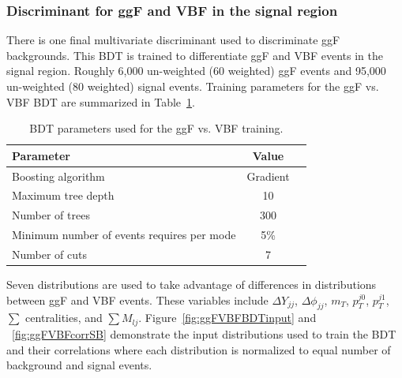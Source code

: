 \subsubsection{Discriminant for ggF and VBF in the signal region}
There is one final multivariate discriminant used to discriminate ggF backgrounds. This BDT is trained to differentiate ggF and VBF events in the signal region. Roughly 6,000 un-weighted (60 weighted) ggF events and 95,000 un-weighted (80 weighted) signal events. Training parameters for the ggF vs. VBF BDT are summarized in Table~\ref{tab:ggFVBFBDTparameters}.
\begin{table}[h!]
\centering
\begin{tabular}{|l|c|c|}
\hline
Parameter                                    & Value     \\
\hline
Boosting algorithm                           & Gradient \\
Maximum tree depth                           &  10      \\
Number of trees                              &  300    \\
Minimum number of events requires per mode   &  5\%     \\
Number of cuts                               &  7       \\
\hline
\end{tabular}
\caption{BDT parameters used for the ggF vs. VBF training.}
\label{tab:ggFVBFBDTparameters}
\end{table}

Seven distributions are used to take advantage of differences in distributions between ggF and VBF events. These variables include $\Delta Y_{jj}$, $\Delta \phi_{jj}$, $m_T$, $p_T^{j0}$, $p_T^{j1}$, $\sum$ centralities, and $\sum M_{lj}$. Figure~\ref{fig:ggFVBFBDTinput} and ~\ref{fig:ggFVBFcorrSB} demonstrate the input distributions used to train the BDT and their correlations where each distribution is normalized to equal number of background and signal events.

